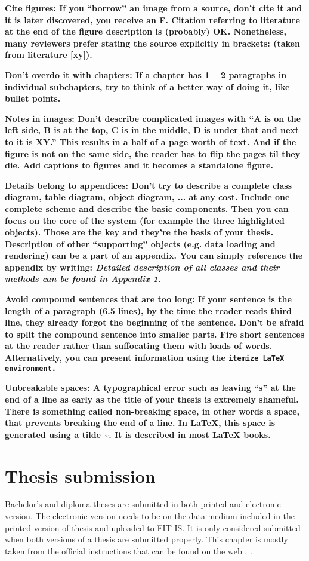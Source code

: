 \bf Cite figures: \rm If you ``borrow'' an image from a source, don't cite it and it is later discovered, you receive an F. Citation referring to literature at the end of the figure description is (probably) OK. Nonetheless, many reviewers prefer stating the source explicitly in brackets: (taken from literature [xy]).

\bf Don't overdo it with chapters: \rm If a chapter has 1 -- 2 paragraphs in individual subchapters, try to think of a better way of doing it, like bullet points.

\bf Notes in images: \rm Don't describe complicated images with ``A is on the left side, B is at the top, C is in the middle, D is under that and next to it is XY.'' This results in a half of a page worth of text. And if the figure is not on the same side, the reader has to flip the pages til they die. Add captions to figures and it becomes a standalone figure.

\bf Details belong to appendices: \rm Don't try to describe a complete class diagram, table diagram, object diagram, ... at any cost. Include one complete scheme and describe the basic components. Then you can focus on the core of the system (for example the three highlighted objects). Those are the key and they're the basis of your thesis. Description of other ``supporting'' objects (e.g. data loading and rendering) can be a part of an appendix. You can simply reference the appendix by writing: \it Detailed description of all classes and their methods can be found in Appendix 1. \rm

\bf Avoid compound sentences that are too long: \rm If your sentence is the length of a paragraph (6.5 lines), by the time the reader reads third line, they already forgot the beginning of the sentence. Don't be afraid to split the compound sentence into smaller parts. Fire short sentences at the reader rather than suffocating them with loads of words. Alternatively, you can present information using the \tt itemize \rm LaTeX environment.

\bf Unbreakable spaces: \rm A typographical error such as leaving ``s'' at the end of a line as early as the title of your thesis is extremely shameful. There is something called non-breaking space, in other words a space, that prevents breaking the end of a line. In LaTeX, this space is generated using a tilde \textasciitilde. It is described in most \LaTeX{} books.

\chapter{Thesis submission}
\label{odevzdani}
Bachelor's and diploma theses are submitted in both printed and electronic version. The electronic version needs to be on the data medium included in the printed version of thesis and uploaded to FIT IS. It is only considered submitted when both versions of a thesis are submitted properly. This chapter is mostly taken from the official instructions that can be found on the web \cite{formalniBP}, \cite{formalniDP}.

